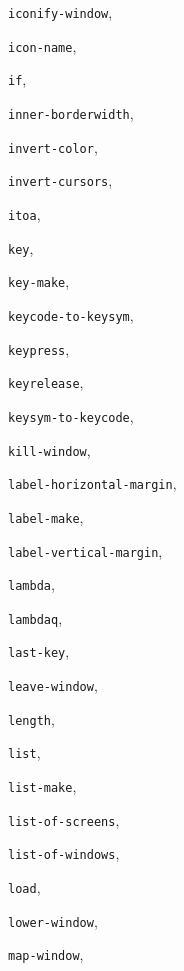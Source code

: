 \begin{theindex}
\item {\tt iconify-window}, {\bf\pageref{iconify-window}}
\item {\tt icon-name}, {\bf\pageref{icon-name}}
\item {\tt if}, {\bf\pageref{if}}
\item {\tt inner-borderwidth}, {\bf\pageref{inner-borderwidth}}
\item {\tt invert-color}, {\bf\pageref{invert-color}}
\item {\tt invert-cursors}, {\bf\pageref{invert-cursors}}
\item {\tt itoa}, {\bf\pageref{itoa}}
\item {\tt key}, {\bf\pageref{key}}
\item {\tt key-make}, {\bf\pageref{key-make}}
\item {\tt keycode-to-keysym}, {\bf\pageref{keycode-to-keysym}}
\item {\tt keypress}, {\bf\pageref{keypress}}
\item {\tt keyrelease}, {\bf\pageref{keyrelease}}
\item {\tt keysym-to-keycode}, {\bf\pageref{keysym-to-keycode}}
\item {\tt kill-window}, {\bf\pageref{kill-window}}
\item {\tt label-horizontal-margin}, {\bf\pageref{label-horizontal-margin}}
\item {\tt label-make}, {\bf\pageref{label-make}}
\item {\tt label-vertical-margin}, {\bf\pageref{label-vertical-margin}}
\item {\tt lambda}, {\bf\pageref{lambda}}
\item {\tt lambdaq}, {\bf\pageref{lambdaq}}
\item {\tt last-key}, {\bf\pageref{last-key}}
\item {\tt leave-window}, {\bf\pageref{leave-window}}
\item {\tt length}, {\bf\pageref{length}}
\item {\tt list}, {\bf\pageref{list}}
\item {\tt list-make}, {\bf\pageref{list-make}}
\item {\tt list-of-screens}, {\bf\pageref{list-of-screens}}
\item {\tt list-of-windows}, {\bf\pageref{list-of-windows}}
\item {\tt load}, {\bf\pageref{load}}
\item {\tt lower-window}, {\bf\pageref{lower-window}}
\item {\tt map-window}, {\bf\pageref{map-window}}

\end{theindex}
